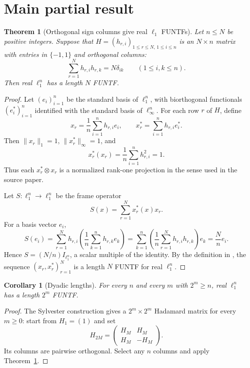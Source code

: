 \documentclass[11pt]{article}
\newtheorem{theorem}{Theorem}
\newtheorem{corollary}{Corollary}
\begin{document}
\section*{Main partial result}

\begin{theorem}[Orthogonal sign columns give real $\ell_1$ FUNTFs]
\label{thm:sign-columns}
Let $n \le N$ be positive integers. Suppose that
$H=(h_{r,i})_{1 \le r \le N,\,1 \le i \le n}$ is an $N \times n$ matrix with
entries in $\{-1,1\}$ and orthogonal columns:
\[
  \sum_{r=1}^N h_{r,i} h_{r,k} = N\delta_{ik}
  \qquad (1 \le i,k \le n).
\]
Then real $\ell_1^n$ has a length $N$ FUNTF.
\end{theorem}

\begin{proof}
Let $(e_i)_{i=1}^n$ be the standard basis of $\ell_1^n$, with biorthogonal
functionals $(e_i^*)_{i=1}^n$ identified with the standard basis of
$\ell_\infty^n$. For each row $r$ of $H$, define
\[
  x_r = \frac1n\sum_{i=1}^n h_{r,i} e_i,
  \qquad
  x_r^* = \sum_{i=1}^n h_{r,i} e_i^* .
\]
Then $\|x_r\|_1=1$, $\|x_r^*\|_\infty=1$, and
\[
  x_r^*(x_r) = \frac1n \sum_{i=1}^n h_{r,i}^2 = 1.
\]
Thus each $x_r^* \otimes x_r$ is a normalized rank-one projection in the
sense used in the source paper.

Let $S:\ell_1^n\to\ell_1^n$ be the frame operator
\[
  S(x)=\sum_{r=1}^N x_r^*(x)x_r.
\]
For a basis vector $e_i$,
\[
  S(e_i)
  = \sum_{r=1}^N h_{r,i}\left(\frac1n\sum_{k=1}^n h_{r,k}e_k\right)
  = \sum_{k=1}^n
      \left(\frac1n\sum_{r=1}^N h_{r,i}h_{r,k}\right)e_k
  = \frac{N}{n} e_i.
\]
Hence $S=(N/n)I_{\ell_1^n}$, a scalar multiple of the identity. By the
definition in \cite{CDFK}, the sequence $(x_r,x_r^*)_{r=1}^N$ is a length
$N$ FUNTF for real $\ell_1^n$.
\end{proof}

\begin{corollary}[Dyadic lengths]
\label{cor:dyadic}
For every $n$ and every $m$ with $2^m \ge n$, real $\ell_1^n$ has a length
$2^m$ FUNTF.
\end{corollary}

\begin{proof}
The Sylvester construction gives a $2^m \times 2^m$ Hadamard matrix for every
$m \ge 0$: start from $H_1=(1)$ and set
\[
  H_{2M} =
  \begin{pmatrix}
    H_M & H_M\\
    H_M & -H_M
  \end{pmatrix}.
\]
Its columns are pairwise orthogonal. Select any $n$ columns and apply
Theorem~\ref{thm:sign-columns}.
\end{proof}
\end{document}
